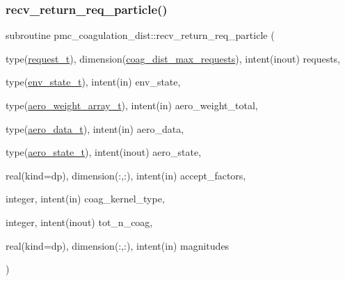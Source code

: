 \mbox{\label{namespacepmc__coagulation__dist_a0e6ac760034791004d9e50f77c786ed4}} 
\subsubsection{\texorpdfstring{recv\+\_\+return\+\_\+req\+\_\+particle()}{recv\_return\_req\_particle()}}
{\footnotesize\ttfamily subroutine pmc\+\_\+coagulation\+\_\+dist\+::recv\+\_\+return\+\_\+req\+\_\+particle (\begin{DoxyParamCaption}\item[{type(\mbox{\hyperlink{structpmc__coagulation__dist_1_1request__t}{request\+\_\+t}}), dimension(\mbox{\hyperlink{namespacepmc__coagulation__dist_ad7130affac816ec06993cec78d709373}{coag\+\_\+dist\+\_\+max\+\_\+requests}}), intent(inout)}]{requests,  }\item[{type(\mbox{\hyperlink{structpmc__env__state_1_1env__state__t}{env\+\_\+state\+\_\+t}}), intent(in)}]{env\+\_\+state,  }\item[{type(\mbox{\hyperlink{structpmc__aero__weight__array_1_1aero__weight__array__t}{aero\+\_\+weight\+\_\+array\+\_\+t}}), intent(in)}]{aero\+\_\+weight\+\_\+total,  }\item[{type(\mbox{\hyperlink{structpmc__aero__data_1_1aero__data__t}{aero\+\_\+data\+\_\+t}}), intent(in)}]{aero\+\_\+data,  }\item[{type(\mbox{\hyperlink{structpmc__aero__state_1_1aero__state__t}{aero\+\_\+state\+\_\+t}}), intent(inout)}]{aero\+\_\+state,  }\item[{real(kind=dp), dimension(\+:,\+:), intent(in)}]{accept\+\_\+factors,  }\item[{integer, intent(in)}]{coag\+\_\+kernel\+\_\+type,  }\item[{integer, intent(inout)}]{tot\+\_\+n\+\_\+coag,  }\item[{real(kind=dp), dimension(\+:,\+:), intent(in)}]{magnitudes }\end{DoxyParamCaption})}


